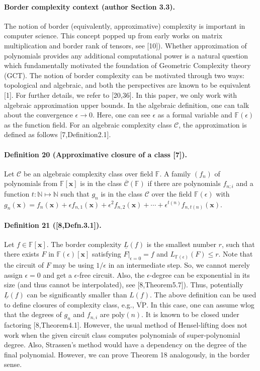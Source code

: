\paragraph{Border complexity context (author Section 3.3).} The notion of border (equivalently, approximative) complexity is important in computer science. This concept popped up from early works on matrix multiplication and border rank of tensors, see [10]). Whether approximation of polynomials provides any additional computational power is a natural question which fundamentally motivated the foundation of Geometric Complexity theory (GCT). The notion of border complexity can be motivated through two ways: topological and algebraic, and both the perspectives are known to be equivalent [1]. For further details, we refer to [20,36]. In this paper, we only work with algebraic approximation upper bounds. In the algebraic definition, one can talk about the convergence $\epsilon\to0$. Here, one can see $\epsilon$ as a formal variable and $\mathbb F(\epsilon)$ as the function field. For an algebraic complexity class $\mathcal C$, the approximation is defined as follows [7,Definition2.1].
\paragraph{Definition 20 (Approximative closure of a class [7]).} Let $\mathcal C$ be an algebraic complexity class over field $\mathbb F$. A family $(f_n)$ of polynomials from $\mathbb F[\mathbf x]$ is in the class $\overline{\mathcal C}(\mathbb F)$ if there are polynomials $f_{n;i}$ and a function $t:\mathbb N\mapsto\mathbb N$ such that $g_n$ is in the class $\mathcal C$ over the field $\mathbb F(\epsilon)$ with $g_n(\mathbf x)=f_n(\mathbf x)+\epsilon f_{n,1}(\mathbf x)+\epsilon^2f_{n,2}(\mathbf x)+\cdots+\epsilon^{t(n)}f_{n,t(n)}(\mathbf x)$.
\paragraph{Definition 21 ([8,Defn.3.1]).} Let $f\in\mathbb F[\mathbf x]$. The border complexity $\underline L(f)$ is the smallest number $r$, such that there exists $F$ in $\mathbb F(\epsilon)[\mathbf x]$ satisfying $F|_{\epsilon=0}=f$ and $L_{\mathbb F(\epsilon)}(F)\le r$.
Note that the circuit of $F$ may be using $1/\epsilon$ in an intermediate step. So, we cannot merely assign $\epsilon=0$ and get a $\epsilon$-free circuit. Also, the $\epsilon$-degree can be exponential in its size (and thus cannot be interpolated), see [8,Theorem5.7]). Thus, potentially $\underline L(f)$ can be significantly smaller than $L(f)$. The above definition can be used to define closures of complexity class, e.g., $\overline{\mathrm{VP}}$. In this case, one can assume wlog that the degrees of $g_n$ and $f_{n,i}$ are $\mathrm{poly}(n)$. It is known to be closed under factoring [8,Theorem4.1]. However, the usual method of Hensel-lifting does not work when the given circuit class computes polynomials of super-polynomial degree. Also, Strassen's method would have a dependency on the degree of the final polynomial. However, we can prove Theorem 18 analogously, in the border sense.
